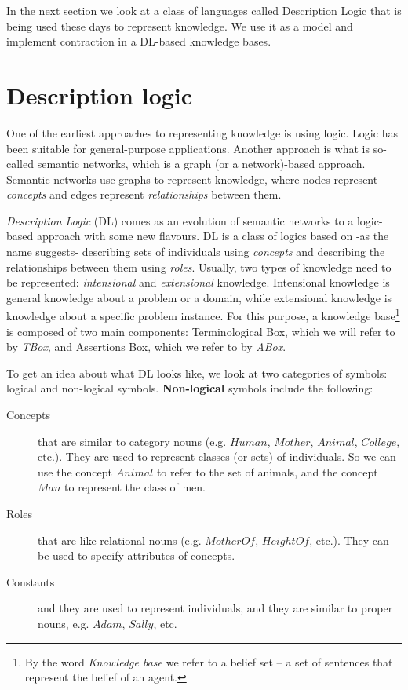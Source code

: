 \documentclass{sfuthesis}
\theoremstyle{plain}
\theoremstyle{definition}
\begin{document}
In the next section we look at a class of languages called Description Logic that is being used these days to represent knowledge. We use it as a model and implement contraction in a DL-based knowledge bases.


\section{Description logic}
\label{dl}
One of the earliest approaches to representing knowledge is using logic. Logic has been suitable for general-purpose applications. Another approach is what is so-called semantic networks, which is a graph (or a network)-based approach. Semantic networks use graphs to represent knowledge\cite{dl}, where nodes represent \textit{concepts} and edges represent \textit{relationships} between them.

\textit{Description Logic} (DL) comes as an evolution of semantic networks to a logic-based approach with some new flavours. DL is a class of logics based on -as the name suggests- describing sets of individuals using \textit{concepts} and describing the relationships between them using \textit{roles}. Usually, two types of knowledge need to be represented: \textit{intensional} and \textit{extensional} knowledge. Intensional knowledge is general knowledge about a problem or a domain, while extensional knowledge is knowledge about a specific problem instance. For this purpose, a knowledge base\footnote{By the word \textit{Knowledge base} we refer to a belief set -- a set of sentences that represent the belief of an agent.} is composed of two main components: Terminological Box, which we will refer to by \textit{TBox}, and Assertions Box, which we refer to by \textit{ABox}.

To get an idea about what DL looks like, we look at two categories of symbols: logical and non-logical symbols. \textbf{Non-logical} symbols include the following:
\begin{description}
\item[Concepts] that are similar to category nouns (e.g. $Human$, $Mother$, $Animal$, $College$, etc.). They are used to represent classes (or sets) of individuals. So we can use the concept $Animal$ to refer to the set of animals, and the concept $Man$ to represent the class of men.
\item[Roles] that are like relational nouns (e.g. $MotherOf$, $HeightOf$, etc.). They can be used to specify attributes of concepts.
\item[Constants] and they are used to represent individuals, and they are similar to proper nouns, e.g. $Adam$, $Sally$, etc.
\end{description}
\end{document}
